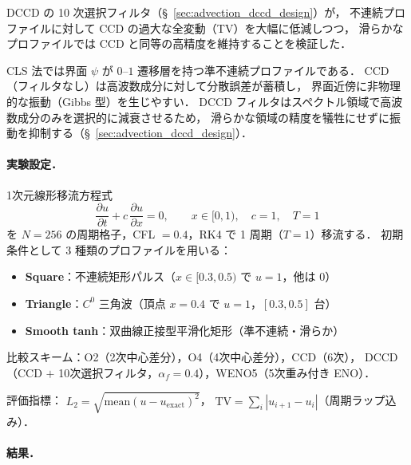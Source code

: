 %

DCCD の 10 次選択フィルタ（§~\ref{sec:advection_dccd_design}）が，
不連続プロファイルに対して CCD の過大な全変動（TV）を大幅に低減しつつ，
滑らかなプロファイルでは CCD と同等の高精度を維持することを検証した．

CLS 法では界面 $\psi$ が $0$–$1$ 遷移層を持つ準不連続プロファイルである．
CCD（フィルタなし）は高波数成分に対して分散誤差が蓄積し，
界面近傍に非物理的な振動（Gibbs 型）を生じやすい．
DCCD フィルタはスペクトル領域で高波数成分のみを選択的に減衰させるため，
滑らかな領域の精度を犠牲にせずに振動を抑制する（§~\ref{sec:advection_dccd_design}）．

\paragraph{実験設定．}

1次元線形移流方程式
\begin{equation}
  \frac{\partial u}{\partial t} + c\,\frac{\partial u}{\partial x} = 0,
  \qquad x \in [0,1),\quad c = 1,\quad T = 1
  \label{eq:linear_advection_dccd}
\end{equation}
を $N=256$ の周期格子，CFL $=0.4$，RK4 で 1 周期（$T=1$）移流する．
初期条件として 3 種類のプロファイルを用いる：
\begin{itemize}[noitemsep]
  \item \textbf{Square}：不連続矩形パルス（$x \in [0.3, 0.5)$ で $u=1$，他は $0$）
  \item \textbf{Triangle}：$C^0$ 三角波（頂点 $x=0.4$ で $u=1$，$[0.3,0.5]$ 台）
  \item \textbf{Smooth tanh}：双曲線正接型平滑化矩形（準不連続・滑らか）
\end{itemize}
比較スキーム：O2（2次中心差分），O4（4次中心差分），CCD（6次），
DCCD（CCD $+$ 10次選択フィルタ，$\alpha_f=0.4$），WENO5（5次重み付き ENO）．

評価指標：
$L_2 = \sqrt{\text{mean}(u-u_\text{exact})^2}$，
$\text{TV} = \sum_i |u_{i+1}-u_i|$（周期ラップ込み）．

\paragraph{結果．}

